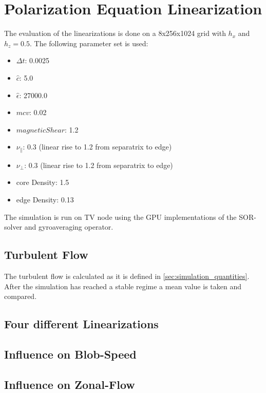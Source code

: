 \documentclass[master.tex]{subfiles}
\begin{document}
\chapter{Polarization Equation Linearization}\label{sec:polarization_equation_evaluation}
The evaluation of the linearizations is done on a 8x256x1024 grid with $h_x$ and $h_z=0.5$. The following parameter set is used:
\begin{itemize}
    \item $\Delta t$: 0.0025
    \item $\hat{c}$: 5.0
    \item $\hat{\epsilon}$: 27000.0
    \item $mcv$: 0.02
    \item $magnetic Shear$: 1.2
    \item $\nu_{\parallel}$: 0.3 (linear rise to 1.2 from separatrix to edge)
    \item $\nu_{\perp}$: 0.3 (linear rise to 1.2 from separatrix to edge)
    \item core Density: 1.5
    \item edge Density: 0.13
\end{itemize}
The simulation is run on \ac{TV} node using the GPU implementations of the \ac{SOR}-solver and gyroaveraging operator. 

\section{Turbulent Flow}
The turbulent flow is calculated as it is defined in \autoref{sec:simulation_quantities}. After the simulation has reached a stable regime a mean value is taken and compared.



\section{Four different Linearizations}
\section{Influence on Blob-Speed}
\section{Influence on Zonal-Flow}
\end{document}
